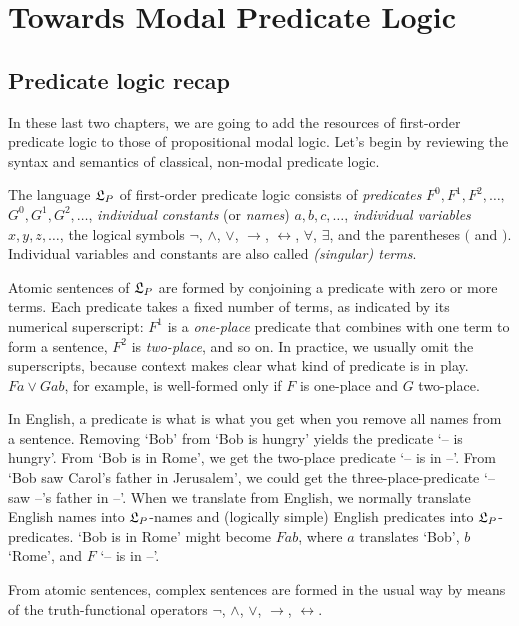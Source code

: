 \chapter{Towards Modal Predicate Logic}\label{ch:qml}


\section{Predicate logic recap}

In these last two chapters, we are going to add the resources of first-order
predicate logic to those of propositional modal logic. Let's begin by reviewing
the syntax and semantics of classical, non-modal predicate logic.

The language $\mathfrak{L}_P$ of first-order predicate logic consists of \emph{predicates}
$F^{0},F^1,F^2,\ldots,$ $G^{0},G^1,G^2,\ldots$, \emph{individual constants} (or
\emph{names}) $a,b,c,\ldots$, \emph{individual variables} $x,y,z,\ldots$, the
logical symbols $\neg$, $\land$, $\lor$, $\to$, $\leftrightarrow$, $\forall$,
$\exists$, and the parentheses $($ and $)$. Individual variables and constants
are also called \emph{(singular) terms}.

Atomic sentences of $\mathfrak{L}_{P}$ are formed by conjoining a predicate with zero or
more terms. Each predicate takes a fixed number of terms, as indicated by its
numerical superscript: $F^1$ is a \emph{one-place} predicate that combines with
one term to form a sentence, $F^2$ is \emph{two-place}, and so on. In practice,
we usually omit the superscripts, because context makes clear what kind of
predicate is in play. $Fa \lor Gab$, for example, is well-formed only if $F$ is
one-place and $G$ two-place.

In English, a predicate is what is what you get when you remove all names from a
sentence. Removing `Bob' from `Bob is hungry' yields the predicate `-- is
hungry'. From `Bob is in Rome', we get the two-place predicate `-- is in --'.
From `Bob saw Carol's father in Jerusalem', we could get the
three-place-predicate `-- saw --'s father in --'. When we translate from
English, we normally translate English names into $\mathfrak{L}_P$-names and (logically
simple) English predicates into $\mathfrak{L}_P$-predicates. `Bob is in Rome' might become
$Fab$, where $a$ translates `Bob', $b$ `Rome', and $F$ `-- is in --'.

From atomic sentences, complex sentences are formed in the usual way by means of
the truth-functional operators $\neg$, $\land$, $\lor$, $\to$,
$\leftrightarrow$.

